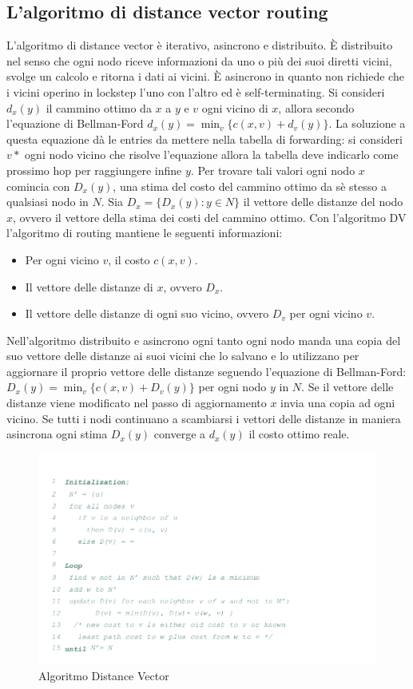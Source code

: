 \subsection{L'algoritmo di distance vector routing}
L'algoritmo di distance vector \`e iterativo, asincrono e distribuito. \`E distribuito nel senso che ogni nodo riceve informazioni da uno o pi\`u dei suoi
diretti vicini, svolge un calcolo e ritorna i dati ai vicini. \`E asincrono in quanto non richiede che i vicini operino in lockstep l'uno con l'altro ed \`e
self-terminating. Si consideri $d_x(y)$ il cammino ottimo da $x$ a $y$ e $v$ ogni vicino di $x$, allora secondo l'equazione di Bellman-Ford $d_x(y)=\min_v
\{c(x, v)+d_v(y)\}$. La soluzione a questa equazione d\`a le entries da mettere nella tabella di forwarding: si consideri $v*$ ogni nodo vicino che risolve
l'equazione allora la tabella deve indicarlo come prossimo hop per raggiungere infine $y$. Per trovare tali valori ogni nodo $x$ comincia con $D_x(y)$, una
stima del costo del cammino ottimo da s\`e stesso a qualsiasi nodo in $N$. Sia $D_x=\{D_x(y):y\in N\}$ il vettore delle distanze del nodo $x$, ovvero il
vettore della stima dei costi del cammino ottimo. Con l'algoritmo DV l'algoritmo di routing mantiene le seguenti informazioni:
\begin{itemize}
\item Per ogni vicino $v$, il costo $c(x, v)$.
\item Il vettore delle distanze di $x$, ovvero $D_x$.
\item Il vettore delle distanze di ogni suo vicino, ovvero $D_v$ per ogni vicino $v$.
\end{itemize}
Nell'algoritmo distribuito e asincrono ogni tanto ogni nodo manda una copia del suo vettore delle distanze ai suoi vicini che lo salvano e lo utilizzano
per aggiornare il proprio vettore delle distanze seguendo l'equazione di Bellman-Ford: $D_x(y)=\min_v\{c(x, v)+D_v(y)\}$ per ogni nodo $y$ in $N$. Se il 
vettore delle distanze viene modificato nel passo di aggiornamento $x$ invia una copia ad ogni vicino. Se tutti i nodi continuano a scambiarsi i vettori 
delle distanze in maniera asincrona ogni stima $D_x(y)$ converge a $d_x(y)$ il costo ottimo reale. 
\begin{figure}[h]
\includegraphics[width=\textwidth]{AlgoritmoDijkstra.png}
\caption{Algoritmo Distance Vector}
\end{figure}
